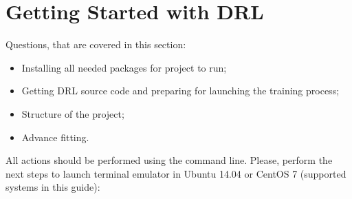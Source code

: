 \documentclass[a4paper,oneside,dvipsnames]{article}
\begin{document}
\section[Getting Started with DRL]{Getting Started with DRL}
\label{sec:gettingStarted}
Questions, that are covered in this section: 
\begin{itemize}
  \item Installing all needed packages for project to run;
  \item Getting DRL source code and preparing for launching the training process;
  \item Structure of the project;
  \item Advance fitting.
\end{itemize}
All actions should be performed using the command line. Please, perform the next steps to launch terminal emulator in Ubuntu 14.04 or CentOS 7 (supported systems in this guide):
\end{document}
